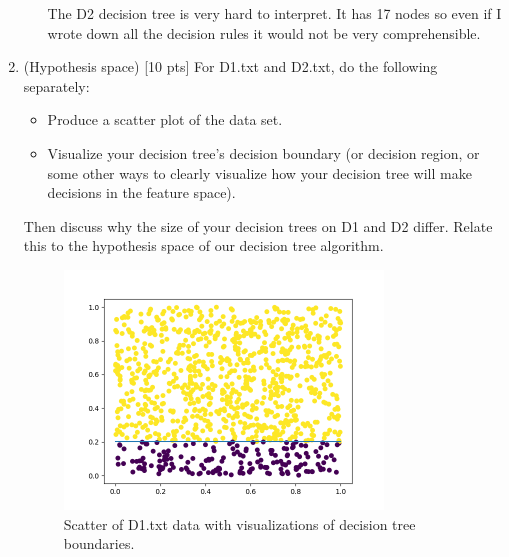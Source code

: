 \documentclass[a4paper]{article}
\theoremstyle{definition}
\newenvironment{soln}{
    \leavevmode\color{blue}\ignorespaces
}{}
\begin{document}
\begin{enumerate}
\begin{itemize}
  \begin{soln}
    The D2 decision tree is very hard to interpret.
    It has 17 nodes so even if I wrote down all the decision rules it would not be very comprehensible.
  \end{soln}
  
  \end{itemize}

\item (Hypothesis space)  [10 pts] For D1.txt and D2.txt, do the following separately:
  \begin{itemize}
  
  \item Produce a scatter plot of the data set.

  \item Visualize your decision tree's decision boundary (or decision region, or some other ways to clearly visualize how your decision tree will make decisions in the feature space).

  \end{itemize}
Then discuss why the size of your decision trees on D1 and D2 differ.  Relate this to the hypothesis space of our decision tree algorithm. \\

\begin{soln}
  \begin{figure}[!h]
    \centering
    \includegraphics[width=0.8\textwidth]{../plots/d1_tree_viz.png}
    \caption{Scatter of D1.txt data with visualizations of decision tree boundaries.}
    \label{fig:d1_tree_viz}
  \end{figure}


\end{soln}
\end{enumerate}
\end{document}
